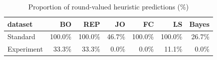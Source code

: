 \begin{table}
\centering
\caption{Proportion of round-valued heuristic predictions (\%)}
\centering
\fontsize{10}{12}\selectfont
\begin{tabular}[t]{lrrrrrr}
\toprule
dataset & BO & REP & JO & FC & LS & Bayes\\
\midrule
Standard & 100.0\% & 100.0\% & 46.7\% & 100.0\% & 100.0\% & 26.7\%\\
Experiment & 33.3\% & 33.3\% & 0.0\% & 0.0\% & 11.1\% & 0.0\%\\
\bottomrule
\end{tabular}
\end{table}
